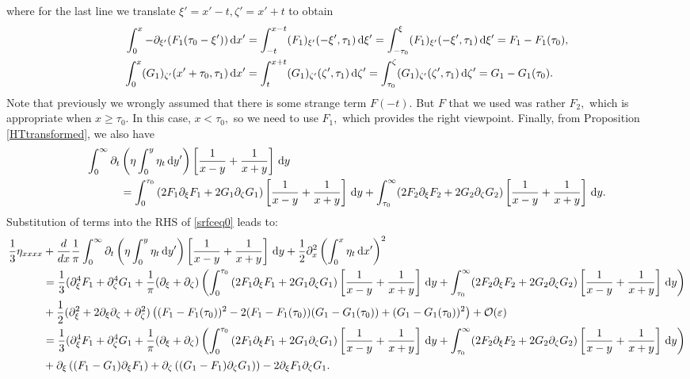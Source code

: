 \documentclass[10pt,reqno,oneside,a4paper, landscape]{article}
\begin{document}
where for the last line we translate $\xi' = x'-t, \zeta' = x'+t$ to obtain
\begin{align*}
 \int^{x}_{0} -\partial_{\xi'}(F_1(\tau_0 - \xi')) \,\mathrm{d} x' &=  \int^{x-t}_{-t}(F_1)_{\xi'}(-\xi', \tau_1) \,\mathrm{d} \xi' =\int^{\xi}_{-\tau_0}(F_1)_{\xi'}(-\xi', \tau_1) \,\mathrm{d} \xi' = F_1 - F_1(\tau_0), \\
\int^{x}_{0} (G_1)_{\zeta'}(x'+\tau_0, \tau_1) \,\mathrm{d} x' &=  \int^{x+t}_{t}(G_1)_{\zeta'}(\zeta', \tau_1) \,\mathrm{d} \zeta' = \int^{\zeta}_{\tau_0}(G_1)_{\zeta'}(\zeta', \tau_1) \,\mathrm{d} \zeta' = G_1 - G_1(\tau_0).
\end{align*}
Note that previously we wrongly assumed that there is some strange term $F(-t).$ But $F$ that we used was rather $F_2,$ which is appropriate when $x \geq \tau_0.$ In this case, $x< \tau_0,$ so we need to use $F_1,$ which provides the right viewpoint. Finally, from Proposition \ref{HTtransformed}, we also have
\begin{align*}
\int_0^\infty \partial_t &\left( \eta \int^{y}_0\eta_{t} \,\mathrm{d} y' \right) \left[ \frac{1}{x-y} + \frac{1}{x+y} \right] \,\mathrm{d} y \\
&=  \int_0^{\tau_0} \left( 2 F_1  \partial_\xi F_1 + 2 G_1 \partial_\zeta G_1 \right) \left[ \frac{1}{x-y} + \frac{1}{x+y} \right] \,\mathrm{d} y +\int_{\tau_0}^\infty (2 F_2 \partial_\xi F_2 + 2 G_2 \partial_\zeta G_2 )\left[ \frac{1}{x-y} + \frac{1}{x+y} \right] \,\mathrm{d} y.
\end{align*}
Substitution of terms into the RHS of \eqref{srfceq0} leads to:
\begin{align}
\frac{1}{3} \eta_{xxxx} &+ \frac{d}{dx} \frac{1}{\pi} \int_0^\infty \partial_t \left( \eta \int^{y}_0\eta_{t} \,\mathrm{d} y' \right) \left[ \frac{1}{x-y} + \frac{1}{x+y} \right] \,\mathrm{d} y + \frac{1}{2} \partial^2_x\left(\int^{x}_0\eta_{t} \,\mathrm{d} x' \right)^2 \nonumber\\
&= \frac{1}{3}(\partial_\xi^4 F_1 + \partial_\zeta^4 G_1 + \frac{1}{\pi} (\partial_\xi + \partial_\zeta) \left( \int_0^{\tau_0} \left( 2 F_1  \partial_\xi F_1 + 2 G_1 \partial_\zeta G_1 \right) \left[ \frac{1}{x-y} + \frac{1}{x+y} \right] \,\mathrm{d} y +\int_{\tau_0}^\infty (2 F_2 \partial_\xi F_2 + 2 G_2 \partial_\zeta G_2 )\left[ \frac{1}{x-y} + \frac{1}{x+y} \right] \,\mathrm{d} y \right) \nonumber \\
&+ \frac{1}{2} (\partial_\xi^2 + 2\partial_\xi \partial_\zeta + \partial_\zeta^2) \left( (F_1 - F_1(\tau_0))^2 - 2(F_1 - F_1(\tau_0))(G_1- G_1(\tau_0)) + (G_1 - G_1(\tau_0))^2 \right) + \mathcal{O}(\varepsilon) \nonumber \\
&=  \frac{1}{3}(\partial_\xi^4 F_1 + \partial_\zeta^4 G_1 + \frac{1}{\pi} (\partial_\xi + \partial_\zeta) \left( \int_0^{\tau_0} \left( 2 F_1  \partial_\xi F_1 + 2 G_1 \partial_\zeta G_1 \right) \left[ \frac{1}{x-y} + \frac{1}{x+y} \right] \,\mathrm{d} y +\int_{\tau_0}^\infty (2 F_2 \partial_\xi F_2 + 2 G_2 \partial_\zeta G_2 )\left[ \frac{1}{x-y} + \frac{1}{x+y} \right] \,\mathrm{d} y \right) \nonumber \\
&+ \partial_\xi\left( (F_1 - G_1)\partial_\xi F_1 \right)+  \partial_\zeta \left( (G_1 - F_1)\partial_\zeta G_1)\right) - 2 \partial_\xi F_1 \partial_\zeta G_1. \label{RHS1-1}
\end{align}
\end{document}
